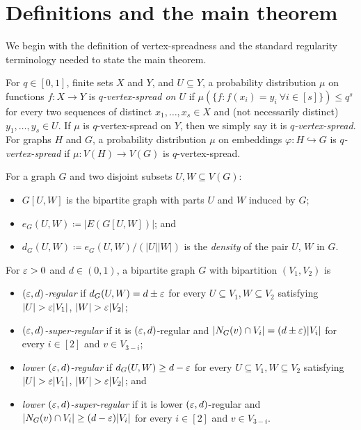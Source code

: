 \documentclass[11pt]{amsart}
\begin{document}
\section{Definitions and the main theorem}
\label{sect:blow-up}

We begin with the definition of vertex-spreadness and the standard regularity
terminology needed to state the main theorem.

\begin{definition}\label{def:vertex-spread}
        For $q \in [0, 1]$, finite sets $X$ and $Y$, and $U \subseteq Y$, a probability distribution $\mu$ on functions $f : X \rightarrow Y$ is \textit{$q$-vertex-spread on $U$} if $\mu(\{f : f(x_i) = y_i~\forall i\in[s]\}) \leq q^s$ for every two sequences of distinct $x_1, \dots, x_s \in X$ and (not necessarily distinct) $y_1, \dots, y_s \in U$.
    If $\mu$ is $q$-vertex-spread on $Y$, then we simply say it is \textit{$q$-vertex-spread}.
    For graphs $H$ and $G$, a probability distribution $\mu$ on embeddings $\varphi : H \hookrightarrow G$ is \textit{$q$-vertex-spread} if $\mu : V(H) \rightarrow V(G)$ is $q$-vertex-spread.
\end{definition}

\begin{definition}
    For a graph $G$ and two disjoint subsets $U, W \subseteq V(G)$:
    \begin{itemize}
        \item $G[U, W]$ is the bipartite graph with parts $U$ and $W$ induced by $G$; 
        \item $e_G(U, W) \coloneqq |E(G[U, W])|$; and 
        \item $d_G(U, W) \coloneqq e_G(U, W) / (|U||W|)$ is the \textit{density} of the pair $U$, $W$ in $G$.  
    \end{itemize}
\end{definition}

\begin{definition}
    For $\varepsilon > 0$ and $d \in (0, 1)$, a bipartite graph $G$ with bipartition $(V_1, V_2)$ is
    \begin{itemize}
        \item \textit{$(\varepsilon, d)$-regular} if $d_G(U, W) = d \pm \varepsilon$ for every $U \subseteq V_1, W \subseteq V_2$ satisfying $|U| > \varepsilon |V_1|$, $|W| > \varepsilon |V_2|$; 
        \item \textit{$(\varepsilon, d)$-super-regular} if it is $(\varepsilon, d)$-regular and $|N_G(v) \cap V_i| = (d \pm \varepsilon)|V_i|$ for every $i \in [2]$ and $v \in V_{3 - i}$;
        \item \textit{lower $(\varepsilon, d)$-regular} if $d_G(U, W) \geq d - \varepsilon$ for every $U \subseteq V_1, W \subseteq V_2$ satisfying $|U| > \varepsilon |V_1|$, $|W| > \varepsilon |V_2|$; and
        \item \textit{lower $(\varepsilon, d)$-super-regular} if it is lower $(\varepsilon, d)$-regular and $\left|N_G(v) \cap V_{i}\right| \geq (d - \varepsilon)|V_{i}|$ for every $i \in [2]$ and $v \in V_{3 - i}$.
    \end{itemize}
\end{definition}
\end{document}
